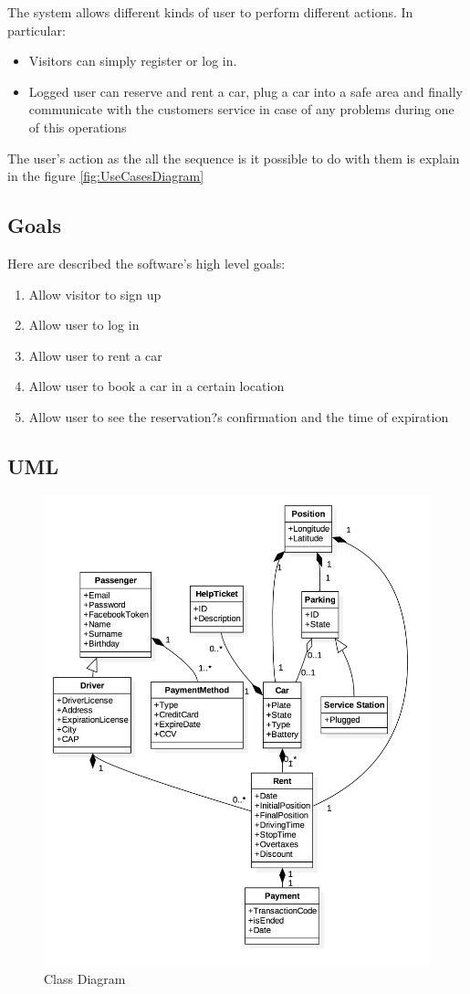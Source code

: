 The system allows different kinds of user to perform different actions. In particular:
\begin{itemize}
	\item Visitors can simply register or log in.
	\item Logged user can reserve and rent a car, plug a car into a safe area and finally communicate with the customers service in case of any problems during one of this operations
\end{itemize}
The user's action as the all the sequence is it possible to do with them is explain in the figure \ref{fig:UseCasesDiagram}

\subsection{Goals}
Here are described the software's high level goals:
\begin{enumerate}[label=\subscript{G}{\arabic*}]
	\item Allow visitor to sign up
	\item Allow user to log in
	\item Allow user to rent a car
	\item Allow user to book a car in a certain location
	\item Allow user to see the reservation?s confirmation and the time of expiration
\end{enumerate}

\subsection{UML}
\begin{figure}[H]
   \begin{center}
    \includegraphics[width=\textwidth]{Resources/UML.png}
    \caption{Class Diagram}
   \end{center}
    \label{fig:ClassDiagram}
\end{figure}
\vfill
\vfill
